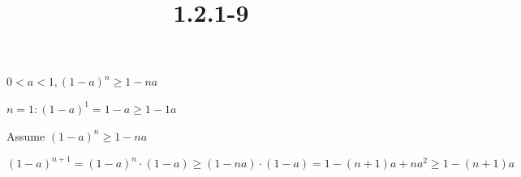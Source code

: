 \documentclass{article}
\title{1.2.1-9}
\begin{document}
\maketitle

\( 0 < a < 1, (1-a)^n\geq 1-na \)

\( n = 1: (1-a)^1=1-a\geq 1 - 1a \)

Assume \( (1-a)^n \geq 1 - na \)

\( (1-a)^{n+1}=(1-a)^n\cdot(1-a)\geq(1-na)\cdot(1-a)=1-(n+1)a+na^2\geq1-(n+1)a \)
\end{document}
